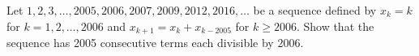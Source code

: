 Let $1, 2, 3, \dots, 2005, 2006, 2007, 2009, 2012, 2016, \dots$
be a sequence defined by $x_k = k$ for $k=1, 2, \dots, 2006$ and
$x_{k+1} = x_k + x_{k-2005}$ for $k \geq 2006$. Show that the sequence has
2005 consecutive terms each divisible by 2006.
